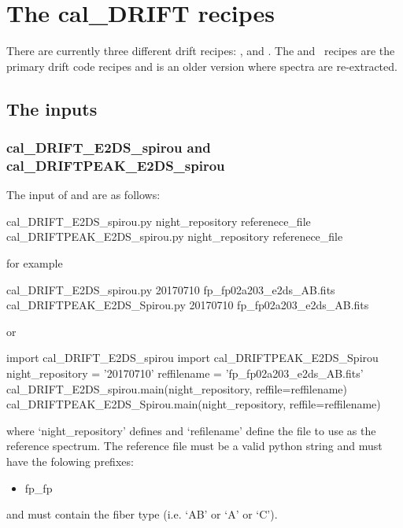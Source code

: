 \clearpage
\newpage
\section{The cal\_DRIFT recipes}
\label{ch:the_recipes:cal_DRIFT_RAW_spirou}

There are currently three different drift recipes: \calDRIFTRAW, \calDRIFTE and \calDRIFTPEAK. The \calDRIFTE and \calDRIFTPEAK\, recipes are the primary drift code recipes and \calDRIFTRAW is an older version where spectra are re-extracted.

\subsection{The inputs}

\subsubsection{cal\_DRIFT\_E2DS\_spirou and cal\_DRIFTPEAK\_E2DS\_spirou}

The input of \calDRIFTE and \calDRIFTPEAK are as follows:
\begin{cmdbox}
cal_DRIFT_E2DS_spirou.py night_repository referenece_file
cal_DRIFTPEAK_E2DS_spirou.py night_repository referenece_file
\end{cmdbox}
\noindent for example
\begin{cmdbox}[title={example}]
cal_DRIFT_E2DS_spirou.py 20170710 fp_fp02a203_e2ds_AB.fits
cal_DRIFTPEAK_E2DS_Spirou.py 20170710 fp_fp02a203_e2ds_AB.fits
\end{cmdbox}
\noindent or
\begin{pythonbox}
import cal_DRIFT_E2DS_spirou
import cal_DRIFTPEAK_E2DS_Spirou
night_repository = '20170710'
reffilename = 'fp_fp02a203_e2ds_AB.fits'
cal_DRIFT_E2DS_spirou.main(night_repository, reffile=reffilename)
cal_DRIFTPEAK_E2DS_Spirou.main(night_repository, reffile=reffilename)
\end{pythonbox}

\noindent where `night\_repository' defines \argnightname and `refilename' define the file to use as the reference spectrum. The reference file must be a valid python string and must have the folowing prefixes:
\begin{itemize}
	\item fp\_fp
\end{itemize}
\noindent and must contain the fiber type (i.e. `AB' or `A' or `C').

